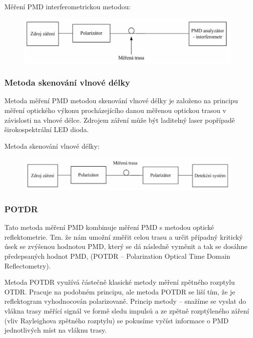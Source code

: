Měření PMD interferometrickou metodou:
\begin{figure}[!ht]
\begin{center}
    \includegraphics[scale=1]{obrazky/merPMD1.png}
  \end{center}
\end{figure}

\subsubsection{Metoda skenování vlnové délky}
Metoda měření PMD metodou skenování vlnové délky je založeno na principu měření optického výkonu procházejícího danou měřenou optickou trasou v závislosti na vlnové délce. Zdrojem záření může být laditelný laser popřípadě širokospektrální LED dioda. 

Metoda skenování vlnové délky:
\begin{figure}[!ht]
\begin{center}
    \includegraphics[scale=1]{obrazky/merPMD2.png}
  \end{center}
\end{figure}

\subsubsection{POTDR}
Tato metoda měření PMD kombinuje měření PMD s metodou optické reflektometrie. Tzn. že nám umožní změřit celou trasu a určit případný kritický úsek se zvýšenou hodnotou PMD, který se dá následně vyměnit a tak se dosáhne předepsaných hodnot PMD, (POTDR – Polarization Optical Time Domain Reflectometry).

Metoda POTDR využívá částečně klasické metody měření zpětného rozptylu OTDR. Pracuje na podobném principu, ale metoda POTDR se liší tím, že je reflektogram vyhodnocován polarizovaně. Princip metody – snažíme se vyslat do vlákna trasy měřící signál ve formě sledu impulsů a ze zpětně rozptýleného záření (vliv Rayleighova zpětného rozptylu) se pokusíme vyčíst informace o PMD jednotlivých míst na vláknu trasy.


